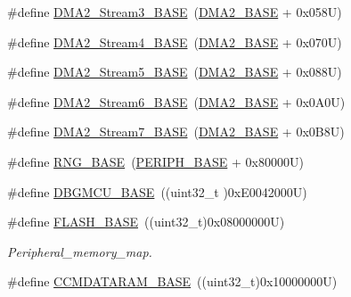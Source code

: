\begin{DoxyCompactItemize}
\item 
\#define \hyperlink{group___peripheral__registers__structures_gaf3a9480e08c6ae94f4482e0cdaebdd17}{D\+M\+A2\+\_\+\+Stream3\+\_\+\+B\+A\+SE}~(\hyperlink{group___peripheral__memory__map_gab72a9ae145053ee13d1d491fb5c1df64}{D\+M\+A2\+\_\+\+B\+A\+SE} + 0x058\+U)
\item 
\#define \hyperlink{group___peripheral__registers__structures_gad1e67740e6301233473f64638145dd1f}{D\+M\+A2\+\_\+\+Stream4\+\_\+\+B\+A\+SE}~(\hyperlink{group___peripheral__memory__map_gab72a9ae145053ee13d1d491fb5c1df64}{D\+M\+A2\+\_\+\+B\+A\+SE} + 0x070\+U)
\item 
\#define \hyperlink{group___peripheral__registers__structures_gaed1460fdc407b6decfbffccb0260d0af}{D\+M\+A2\+\_\+\+Stream5\+\_\+\+B\+A\+SE}~(\hyperlink{group___peripheral__memory__map_gab72a9ae145053ee13d1d491fb5c1df64}{D\+M\+A2\+\_\+\+B\+A\+SE} + 0x088\+U)
\item 
\#define \hyperlink{group___peripheral__registers__structures_ga5e81174c96fd204fa7c82c815e85c8e6}{D\+M\+A2\+\_\+\+Stream6\+\_\+\+B\+A\+SE}~(\hyperlink{group___peripheral__memory__map_gab72a9ae145053ee13d1d491fb5c1df64}{D\+M\+A2\+\_\+\+B\+A\+SE} + 0x0\+A0\+U)
\item 
\#define \hyperlink{group___peripheral__registers__structures_gaa9faa708ad2440d24eb1064cba9bb06d}{D\+M\+A2\+\_\+\+Stream7\+\_\+\+B\+A\+SE}~(\hyperlink{group___peripheral__memory__map_gab72a9ae145053ee13d1d491fb5c1df64}{D\+M\+A2\+\_\+\+B\+A\+SE} + 0x0\+B8\+U)
\item 
\#define \hyperlink{group___peripheral__registers__structures_gab92662976cfe62457141e5b4f83d541c}{R\+N\+G\+\_\+\+B\+A\+SE}~(\hyperlink{group___peripheral__memory__map_ga9171f49478fa86d932f89e78e73b88b0}{P\+E\+R\+I\+P\+H\+\_\+\+B\+A\+SE} + 0x80000\+U)
\item 
\#define \hyperlink{group___peripheral__registers__structures_ga4adaf4fd82ccc3a538f1f27a70cdbbef}{D\+B\+G\+M\+C\+U\+\_\+\+B\+A\+SE}~((uint32\+\_\+t )0x\+E0042000\+U)
\item 
\#define \hyperlink{group___peripheral__registers__structures_ga23a9099a5f8fc9c6e253c0eecb2be8db}{F\+L\+A\+S\+H\+\_\+\+B\+A\+SE}~((uint32\+\_\+t)0x08000000\+U)
\begin{DoxyCompactList}\small\item\em Peripheral\+\_\+memory\+\_\+map. \end{DoxyCompactList}\item 
\#define \hyperlink{group___peripheral__registers__structures_gabea1f1810ebeac402164b42ab54bcdf9}{C\+C\+M\+D\+A\+T\+A\+R\+A\+M\+\_\+\+B\+A\+SE}~((uint32\+\_\+t)0x10000000\+U)

\end{DoxyCompactItemize}
